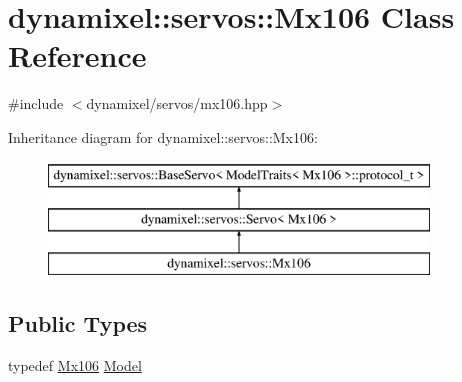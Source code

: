 \hypertarget{classdynamixel_1_1servos_1_1_mx106}{}\section{dynamixel\+:\+:servos\+:\+:Mx106 Class Reference}
\label{classdynamixel_1_1servos_1_1_mx106}


{\ttfamily \#include $<$dynamixel/servos/mx106.\+hpp$>$}

Inheritance diagram for dynamixel\+:\+:servos\+:\+:Mx106\+:\begin{figure}[H]
\begin{center}
\leavevmode
\includegraphics[height=3.000000cm]{classdynamixel_1_1servos_1_1_mx106}
\end{center}
\end{figure}
\subsection*{Public Types}
\begin{DoxyCompactItemize}
\item 
typedef \hyperlink{classdynamixel_1_1servos_1_1_mx106}{Mx106} \hyperlink{classdynamixel_1_1servos_1_1_mx106_abdde9ccd67391ac3df136edee77f9534}{Model}
\end{DoxyCompactItemize}
